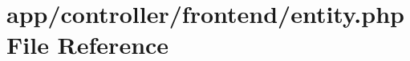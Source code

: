 \hypertarget{controller_2frontend_2entity_8php}{\section{app/controller/frontend/entity.php File Reference}
\label{controller_2frontend_2entity_8php}
}
